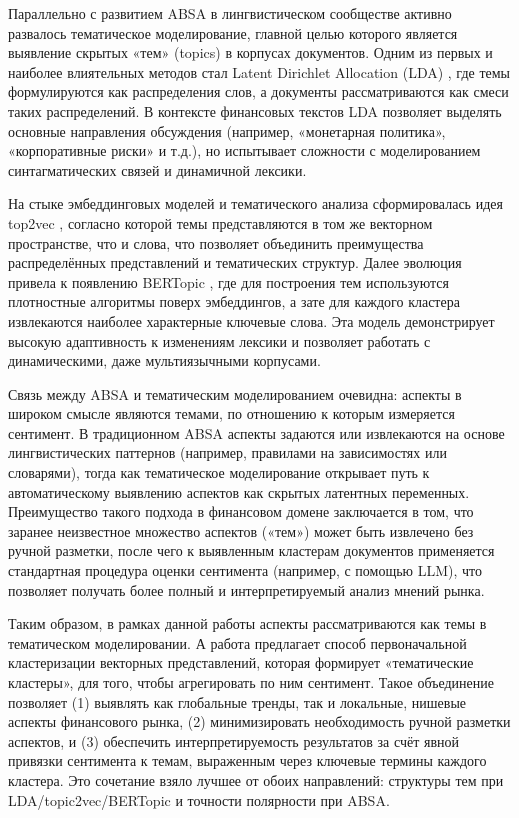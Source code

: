 Параллельно с развитием ABSA в лингвистическом сообществе активно развалось тематическое моделирование,
главной целью которого является выявление скрытых «тем» (topics) в корпусах документов. Одним из первых
и наиболее влиятельных методов стал Latent Dirichlet Allocation (LDA) \parencite{LDA2003}, где темы
формулируются как распределения слов, а документы рассматриваются как смеси таких распределений. В контексте
финансовых текстов LDA позволяет выделять основные направления обсуждения (например, «монетарная политика»,
«корпоративные риски» и т.д.), но испытывает сложности с моделированием синтагматических связей и динамичной
лексики.

На стыке эмбеддинговых моделей и тематического анализа сформировалась идея top2vec \parencite{angelov2020top2vec},
согласно которой темы представляются в том же векторном пространстве, что и слова, что позволяет объединить
преимущества распределённых представлений и тематических структур. Далее эволюция привела к появлению BERTopic
\parencite{BERTopic2022}, где для построения тем используются плотностные алгоритмы поверх эмбеддингов, а зате
 для каждого кластера извлекаются наиболее характерные ключевые слова. Эта модель демонстрирует высокую
 адаптивность к изменениям лексики и позволяет работать с динамическими, даже мультиязычными корпусами.

Связь между ABSA и тематическим моделированием очевидна: аспекты в широком смысле являются темами, по отношению
к которым измеряется сентимент. В традиционном ABSA аспекты задаются или извлекаются на основе лингвистических
паттернов (например, правилами на зависимостях или словарями), тогда как тематическое моделирование открывает
путь к автоматическому выявлению аспектов как скрытых латентных переменных. Преимущество такого подхода
в финансовом домене заключается в том, что заранее неизвестное множество аспектов («тем») может быть извлечено
без ручной разметки, после чего к выявленным кластерам документов применяется стандартная процедура оценки
сентимента (например, с помощью LLM), что позволяет получать более полный и интерпретируемый анализ мнений рынка.

Таким образом, в рамках данной работы аспекты рассматриваются как темы в тематическом моделировании. А работа
предлагает способ первоначальной кластеризации векторных представлений, которая формирует «тематические кластеры»,
для того, чтобы агрегировать по ним сентимент. Такое объединение позволяет (1) выявлять как глобальные тренды,
так и локальные, нишевые аспекты финансового рынка, (2) минимизировать необходимость ручной разметки аспектов,
и (3) обеспечить интерпретируемость результатов за счёт явной привязки сентимента к темам, выраженным через
ключевые термины каждого кластера. Это сочетание взяло лучшее от обоих направлений: структуры тем
при LDA/topic2vec/BERTopic и точности полярности при ABSA.